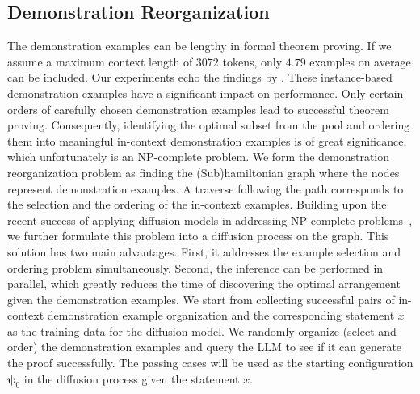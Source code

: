 \documentclass{article}
\begin{document}
\subsection{Demonstration Reorganization}
\label{sec:diffusion-based organization}
The demonstration examples can be lengthy in formal theorem proving. If we assume a maximum context length of $3072$ tokens, only $4.79$ examples on average can be included. Our experiments echo the findings by \citet{wu2022self}. These instance-based demonstration examples have a significant impact on performance. Only certain orders of carefully chosen demonstration examples lead to successful theorem proving. Consequently, identifying the optimal subset from the pool and ordering them into meaningful in-context demonstration examples is of great significance, which unfortunately is an NP-complete problem. We form the demonstration reorganization problem as finding the (Sub)hamiltonian graph where the nodes represent demonstration examples. A traverse following the path corresponds to the selection and the ordering of the in-context examples.
Building upon the recent success of applying diffusion models in addressing NP-complete problems~\cite{graikos2022diffusion,sun2023difusco}, we further formulate this problem into a diffusion process on the graph. This solution has two main advantages. First, it addresses the example selection and ordering problem simultaneously. Second, the inference can be performed in parallel, which greatly reduces the time of discovering the optimal arrangement given the demonstration examples. We start from collecting successful pairs of in-context demonstration example organization and the corresponding statement $x$ as the training data for the diffusion model. We randomly organize (select and order) the demonstration examples and query the LLM to see if it can generate the proof successfully. The passing cases will be used as the starting configuration $\boldsymbol{\psi}_0$ in the diffusion process given the statement $x$.
\end{document}
